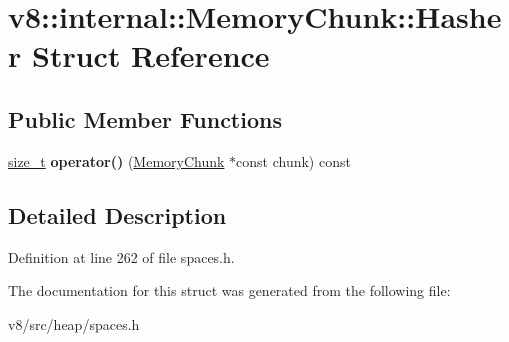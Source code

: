 \hypertarget{structv8_1_1internal_1_1MemoryChunk_1_1Hasher}{}\section{v8\+:\+:internal\+:\+:Memory\+Chunk\+:\+:Hasher Struct Reference}
\label{structv8_1_1internal_1_1MemoryChunk_1_1Hasher}
\subsection*{Public Member Functions}
\begin{DoxyCompactItemize}
\item 
\mbox{\label{structv8_1_1internal_1_1MemoryChunk_1_1Hasher_a1f49a7673e0f4cf6eedd9c37cc5e1ada}} 
\mbox{\hyperlink{classsize__t}{size\+\_\+t}} {\bfseries operator()} (\mbox{\hyperlink{classv8_1_1internal_1_1MemoryChunk}{Memory\+Chunk}} $\ast$const chunk) const
\end{DoxyCompactItemize}


\subsection{Detailed Description}


Definition at line 262 of file spaces.\+h.



The documentation for this struct was generated from the following file\+:\begin{DoxyCompactItemize}
\item 
v8/src/heap/spaces.\+h\end{DoxyCompactItemize}
